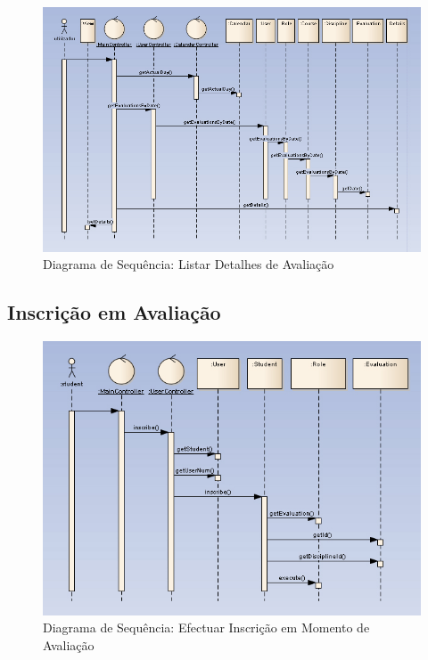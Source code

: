 \begin{figure}[!htbp]
\centering
\includegraphics{imagens/listar_detalhes.jpg}
\caption{Diagrama de Sequência: Listar Detalhes de Avaliação}
\label{fig:listar_detalhes}
\end{figure}



\clearpage
\subsection{Inscrição em Avaliação}

\begin{figure}[!htbp]
\centering
\includegraphics{imagens/inscrever_avaliacao.jpg}
\caption{Diagrama de Sequência: Efectuar Inscrição em Momento de Avaliação}
\label{fig:inscrever_avaliacao}
\end{figure}

